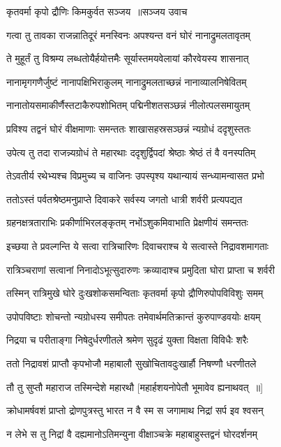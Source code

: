 \twolineshloka
{कृतवर्मा कृपो द्रौणिः किमकुर्वत सञ्जय ॥सञ्जय उवाच}
{}


\twolineshloka
{गत्वा तु तावका राजन्नातिदूरं मनस्विनः}
{अपश्यन्त वनं घोरं नानाद्रुमलतावृतम्}


\twolineshloka
{ते मुहूर्तं तु विश्रम्य लब्धतोयैर्हयोत्तमैः}
{सूर्यास्तमयवेलायां कौरवेयस्य शासनात्}


\twolineshloka
{नानामृगगणैर्जुष्टं नानापक्षिभिराकुलम्}
{नानाद्रुमलताच्छन्नं नानाव्यालनिषेवितम्}


\twolineshloka
{नानातोयसमाकीर्णैस्तटाकैरुपशोभितम्}
{पद्मिनीशतसञ्छन्नं नीलोत्पलसमायुतम्}


\twolineshloka
{प्रविश्य तद्वनं घोरं वीक्षमाणाः समन्ततः}
{शाखासहस्रसञ्छन्नं न्यग्रोधं ददृशुस्ततः}


\twolineshloka
{उपेत्य तु तदा राजन्न्यग्रोधं ते महारथाः}
{ददृशुर्द्विपदां श्रेष्ठाः श्रेष्ठं तं वै वनस्पतिम्}


\twolineshloka
{तेऽवतीर्य रथेभ्यश्च विप्रमुच्य च वाजिनः}
{उपस्पृश्य यथान्यायं सन्ध्यामन्वासत प्रभो}


\twolineshloka
{ततोऽस्तं पर्वतश्रेष्ठमनुप्राप्ते दिवाकरे}
{सर्वस्य जगतो धात्री शर्वरी प्रत्यपद्यत}


\twolineshloka
{ग्रहनक्षत्रताराभिः प्रकीर्णाभिरलङ्कृतम्}
{नभोंऽशुकमिवाभाति प्रेक्षणीयं समन्ततः}


\twolineshloka
{इच्छया ते प्रवल्गन्ति ये सत्वा रात्रिचारिणः}
{दिवाचराश्च ये सत्वास्ते निद्रावशमागताः}


\twolineshloka
{रात्रिञ्चराणां सत्वानां निनादोऽभूत्सुदारुणः}
{क्रव्यादाश्च प्रमुदिता घोरा प्राप्ता च शर्वरी}


\twolineshloka
{तस्मिन् रात्रिमुखे घोरे दुःखशोकसमन्विताः}
{कृतवर्मा कृपो द्रौणिरुपोपविविशुः समम्}


\twolineshloka
{उपोपविष्टाः शोचन्तो न्यग्रोधस्य समीपतः}
{तमेवार्थमतिक्रान्तं कुरुपाण्डवयोः क्षयम्}


\twolineshloka
{निद्रया च परीताङ्गा निषेदुर्धरणीतले}
{श्रमेण सुदृढं युक्ता विक्षता विविधैः शरैः}


\twolineshloka
{ततो निद्रावशं प्राप्तौ कृपभोजौ महाबालौ}
{सुखोचितावदुःखार्हौ निषण्णौ धरणीतले}


\twolineshloka
{तौ तु सुप्तौ महाराज तस्मिन्देशे महारथौ}
{[महार्हशयनोपेतौ भूमावेव ह्यनाथवत् ॥]}


\twolineshloka
{क्रोधामर्षवशं प्राप्तो द्रोणपुत्रस्तु भारत}
{न वै स्म स जगामाथ निद्रां सर्प इव श्वसन्}


\twolineshloka
{न लेभे स तु निद्रां वै दह्यमानोऽतिमन्युना}
{वीक्षाञ्चक्रे महाबाहुस्तद्वनं घोरदर्शनम्}


